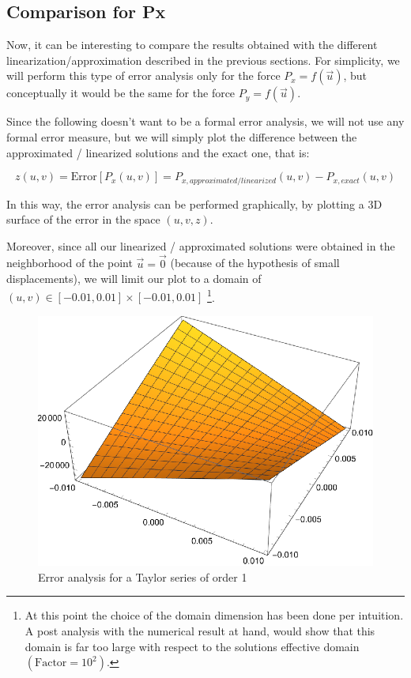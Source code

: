 \subsection{Comparison for Px}
\label{subsec:comparison}

Now, it can be interesting to compare the results obtained with the different linearization/approximation described in the previous sections.
For simplicity, we will perform this type of error analysis only for the force $P_x = f(\vec{u})$, but conceptually it would be the same for the force $P_y = f(\vec{u})$.

Since the following doesn't want to be a formal error analysis, we will not use any formal error measure, but we will simply plot the difference between the approximated / linearized solutions and the exact one, that is:

\begin{equation}
    z(u,v) = \text{Error}[P_x(u,v)] = P_{x,approximated/linearized}(u,v) - P_{x,exact}(u,v)
\end{equation}

In this way, the error analysis can be performed graphically, by plotting a 3D surface of the error in the space $(u,v,z)$.

Moreover, since all our linearized / approximated solutions were obtained in the neighborhood of the point $\vec{u} = \vec{0}$ (because of the hypothesis of small displacements), we will limit our plot to a domain of $(u,v) \in [-0.01, 0.01] \times [-0.01, 0.01]$
\footnote{At this point the choice of the domain dimension has been done per intuition. A post analysis with the numerical result at hand, would show that this domain is far too large with respect to the solutions effective domain $(\text{Factor}=10^2)$.}.

\begin{figure}[H]
    \centering
    \includegraphics[width=.5\textwidth]{./pdf/error_taylor_order_1}
    \caption{Error analysis for a Taylor series of order 1}
    \label{fig:error_taylor_order_1}
\end{figure}

